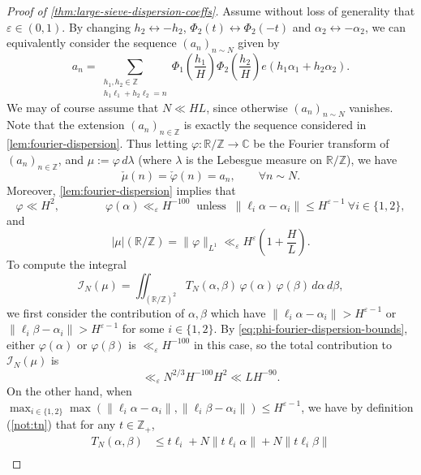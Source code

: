 \documentclass[reqno,11pt]{amsart}
\theoremstyle{remark}
\numberwithin{equation}{section}
\newcommand{\Z}{\mathbb{Z}}
\newcommand{\R}{\mathbb{R}}
\newcommand{\C}{\mathbb{C}}
\newcommand{\mI}{\mathcal{I}}
\newcommand{\eps}{\varepsilon}
\begin{document}
\begin{proof}[Proof of \cref{thm:large-sieve-dispersion-coeffs}]
Assume without loss of generality that $\eps \in (0, 1)$. By changing $h_2 \leftrightarrow -h_2$, $\Phi_2(t) \leftrightarrow \Phi_2(-t)$ and $\alpha_2 \leftrightarrow -\alpha_2$, we can equivalently consider the sequence $(a_n)_{n \sim N}$ given by
\[
    a_n = 
    \sum_{\substack{h_1, h_2 \in \Z \\ h_1\ell_1 + h_2\ell_2 = n}}
    \Phi_1\left(\frac{h_1}{H}\right) \Phi_2\left(\frac{h_2}{H}\right) e(h_1 \alpha_1 + h_2 \alpha_2).
\]
We may of course assume that $N \ll HL$, since otherwise $(a_n)_{n\sim N}$ vanishes. Note that the extension $(a_n)_{n \in \Z}$ is exactly the sequence considered in \cref{lem:fourier-dispersion}. Thus letting $\varphi : \R/\Z \to \C$ be the Fourier transform of $(a_n)_{n \in \Z}$, and $\mu := \varphi\, d\lambda$ (where $\lambda$ is the Lebesgue measure on $\R/\Z$), we have
\[
    \check{\mu}(n) = 
    \check{\varphi}(n) =
    a_n, \qquad \forall n \sim N.
\]
Moreover, \cref{lem:fourier-dispersion} implies that 
\begin{equation} \label{eq:phi-fourier-dispersion-bounds}
    \varphi \ll H^2, 
    \qquad\qquad 
    \varphi(\alpha) \ll_\eps H^{-100} \ 
    \text{ unless } \
    \|\ell_i \alpha - \alpha_i\| \le H^{\eps-1}\ 
    \forall i \in \{1, 2\},
\end{equation}
and
\begin{equation} \label{eq:mu-total-mass}
    |\mu|(\R/\Z) = \|\varphi\|_{L^1} \ll_\eps H^\eps \left(1 + \frac{H}{L}\right).
\end{equation}
To compute the integral 
\[
    \mI_N(\mu)
    =
    \iint_{(\R/\Z)^2} T_N(\alpha, \beta)\, \varphi(\alpha)\, \varphi(\beta)\, d\alpha\, d\beta,
\]
we first consider the contribution of $\alpha, \beta$ which have $\|\ell_i \alpha - \alpha_i\| >  H^{\eps-1}$ or $\|\ell_i \beta - \alpha_i\| > H^{\eps-1}$ for some $i \in \{1, 2\}$. By \cref{eq:phi-fourier-dispersion-bounds}, either $\varphi(\alpha)$ or $\varphi(\beta)$ is $\ll_\eps H^{-100}$ in this case, so the total contribution to $\mI_{N}(\mu)$ is
\[
    \ll_\eps N^{2/3} H^{-100} H^2
    \ll 
    L H^{-90}.
\]
On the other hand, when $\max_{i \in \{1,2\}} \max(\|\ell_i \alpha - \alpha_i\|, \|\ell_i \beta - \alpha_i\|) \le H^{\eps-1}$, we have by definition (\cref{not:tn}) that for any $t \in \Z_+$,
\[
\begin{aligned}
    T_N(\alpha, \beta) 
    &\le 
    t\ell_i + N \|t\ell_i \alpha\| + N \|t\ell_i \beta\| 
    \\

\end{aligned}\]
\end{proof}
\end{document}
